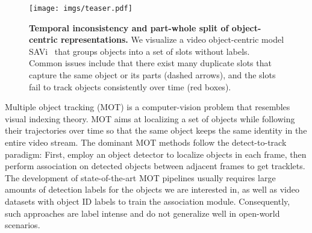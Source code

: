 \begin{figure}[!t]
	\centering
	\texttt{[image: imgs/teaser.pdf]}
 \vspace{+0.3cm}
\caption{\textbf{Temporal inconsistency and part-whole split of object-centric representations. } We visualize a video object-centric model SAVi~\cite{kipf2022conditional} that groups objects into a set of slots without labels. Common issues include that there exist many duplicate slots that capture the same object or its parts (dashed arrows),  and the slots fail to track objects consistently over time (red boxes). 
 }
\label{fig:teaser}
\end{figure}

Multiple object tracking (MOT) is a computer-vision problem that resembles visual indexing theory.
MOT aims at localizing a set of objects while following their trajectories over time so that the same object keeps the same identity in the entire video stream.
The dominant MOT methods follow the detect-to-track paradigm: First, employ an object detector to localize objects in each frame, then perform association on detected objects between adjacent frames to get tracklets.
The development of state-of-the-art MOT pipelines usually requires large amounts of detection labels for the objects we are interested in, as well as video datasets with object ID labels to train the association module.
Consequently, such approaches are label intense and do not generalize well in open-world scenarios.




